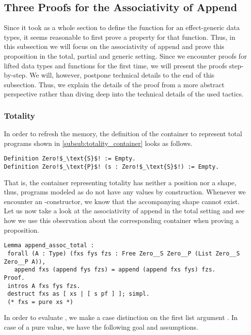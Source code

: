 \subsection{Three Proofs for the Associativity of Append}

Since it took as a whole section to define the function 
for an effect-generic  data types, it seems reasonable to
first prove a property for that function.
Thus, in this subsection we will focus on the associativity of append
and prove this proposition in the total, partial and generic setting.
Since we encounter proofs for lifted data types and functions for the
first time, we will present the proofs step-by-step.
We will, however, postpone technical details to the end of this
subsection.
Thus, we explain the details of the proof from a more abstract
perspective rather than diving deep into the technical details of the
used tactics.

\subsubsection{Totality}
In order to refresh the memory, the definition of the
container to represent total programs shown in
\autoref{subsub:totality_container} looks as follows.

\begin{verbatim}
Definition Zero!$_\text{S}$! := Empty.
Definition Zero!$_\text{P}$! (s : Zero!$_\text{S}$!) := Empty.
\end{verbatim}

That is, the container representing totality has neither a position
nor a shape, thus, programs modeled as  do
not have any  values by construction.
Whenever we encounter an -constructor, we know that the
accompanying shape  cannot exist.
Let us now take a look at the associativity of append in the total
setting and see how we use this observation about the corresponding
container when proving a proposition.

\begin{verbatim}
Lemma append_assoc_total :
 forall (A : Type) (fxs fys fzs : Free Zero__S Zero__P (List Zero__S Zero__P A)),
   append fxs (append fys fzs) = append (append fxs fys) fzs.
Proof.
 intros A fxs fys fzs.
 destruct fxs as [ xs | [ s pf ] ]; simpl.
 (* fxs = pure xs *)
\end{verbatim}

In order to evaluate , we make a case distinction on the
first list argument .
In case of a pure value, we have the following goal and assumptions.

